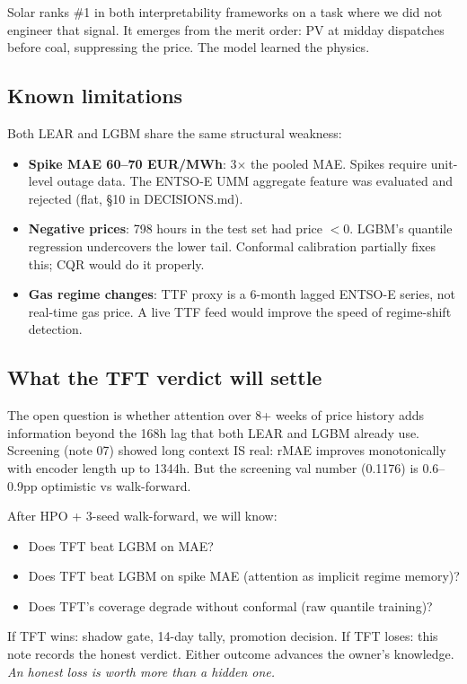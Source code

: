 Solar ranks \#1 in both interpretability frameworks on a task where
we did not engineer that signal. It emerges from the merit order: PV
at midday dispatches before coal, suppressing the price.
The model learned the physics.

\subsection{Known limitations}

Both LEAR and LGBM share the same structural weakness:

\begin{itemize}
  \item \textbf{Spike MAE 60--70 EUR/MWh}: 3$\times$ the pooled MAE.
        Spikes require unit-level outage data. The ENTSO-E UMM aggregate
        feature was evaluated and rejected (flat, \S10 in DECISIONS.md).
  \item \textbf{Negative prices}: 798 hours in the test set had price $< 0$.
        LGBM's quantile regression undercovers the lower tail.
        Conformal calibration partially fixes this; CQR would do it properly.
  \item \textbf{Gas regime changes}: TTF proxy is a 6-month lagged ENTSO-E
        series, not real-time gas price. A live TTF feed would improve the
        speed of regime-shift detection.
\end{itemize}

\subsection{What the TFT verdict will settle}

The open question is whether attention over 8+ weeks of price history
adds information beyond the 168h lag that both LEAR and LGBM already use.
Screening (note 07) showed long context IS real: rMAE improves monotonically
with encoder length up to 1344h. But the screening val number (0.1176)
is 0.6--0.9pp optimistic vs walk-forward.

After HPO + 3-seed walk-forward, we will know:

\begin{itemize}
  \item Does TFT beat LGBM on MAE?
  \item Does TFT beat LGBM on spike MAE (attention as implicit regime memory)?
  \item Does TFT's coverage degrade without conformal (raw quantile training)?
\end{itemize}

If TFT wins: shadow gate, 14-day tally, promotion decision.
If TFT loses: this note records the honest verdict.
Either outcome advances the owner's knowledge.
\emph{An honest loss is worth more than a hidden one.}
